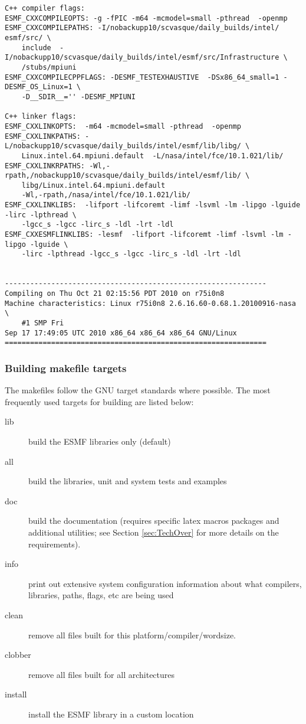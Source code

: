 \begin{verbatim}
C++ compiler flags:
ESMF_CXXCOMPILEOPTS: -g -fPIC -m64 -mcmodel=small -pthread  -openmp
ESMF_CXXCOMPILEPATHS: -I/nobackupp10/scvasque/daily_builds/intel/ esmf/src/ \
	include  -I/nobackupp10/scvasque/daily_builds/intel/esmf/src/Infrastructure \
	/stubs/mpiuni
ESMF_CXXCOMPILECPPFLAGS: -DESMF_TESTEXHAUSTIVE  -DSx86_64_small=1 -DESMF_OS_Linux=1 \
	-D__SDIR__='' -DESMF_MPIUNI

C++ linker flags:
ESMF_CXXLINKOPTS:  -m64 -mcmodel=small -pthread  -openmp
ESMF_CXXLINKPATHS: -L/nobackupp10/scvasque/daily_builds/intel/esmf/lib/libg/ \
	Linux.intel.64.mpiuni.default  -L/nasa/intel/fce/10.1.021/lib/
ESMF_CXXLINKRPATHS: -Wl,-rpath,/nobackupp10/scvasque/daily_builds/intel/esmf/lib/ \
	libg/Linux.intel.64.mpiuni.default 
	-Wl,-rpath,/nasa/intel/fce/10.1.021/lib/
ESMF_CXXLINKLIBS:  -lifport -lifcoremt -limf -lsvml -lm -lipgo -lguide -lirc -lpthread \
	-lgcc_s -lgcc -lirc_s -ldl -lrt -ldl
ESMF_CXXESMFLINKLIBS: -lesmf  -lifport -lifcoremt -limf -lsvml -lm -lipgo -lguide \
	-lirc -lpthread -lgcc_s -lgcc -lirc_s -ldl -lrt -ldl


--------------------------------------------------------------
Compiling on Thu Oct 21 02:15:56 PDT 2010 on r75i0n8
Machine characteristics: Linux r75i0n8 2.6.16.60-0.68.1.20100916-nasa \
	#1 SMP Fri 
Sep 17 17:49:05 UTC 2010 x86_64 x86_64 x86_64 GNU/Linux
==============================================================

\end{verbatim}


\subsubsection{Building makefile targets}

The makefiles follow the GNU target standards where possible.
The most frequently used targets for building are listed below:
\begin{description}
\item[lib] build the ESMF libraries only (default)
\item[all] build the libraries, unit and system tests and examples
\item[doc] build the documentation (requires specific latex macros packages
and additional utilities; see Section \ref{sec:TechOver} for more details
on the requirements).  
\item[info] print out extensive system configuration information about what
           compilers, libraries, paths, flags, etc are being used
\item[clean] remove all files built for this platform/compiler/wordsize.
\item[clobber] remove all files built for all architectures
\item[install] install the ESMF library in a custom location
\end{description}


